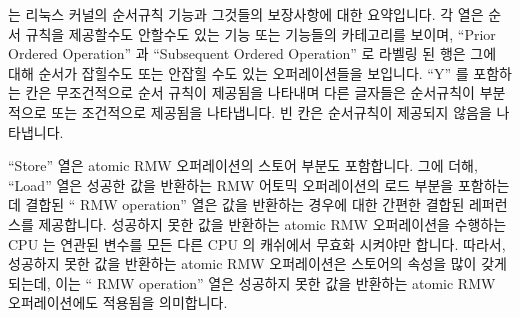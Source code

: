 \begin{table}[tbp]
\vspace{5pt}\hfill
{}\OneColumnHSpace{-0.9in}
\caption{Linux-Kernel Memory-Ordering Cheat Sheet}
\label{tab:memorder:Linux-Kernel Memory-Ordering Cheat Sheet}
\end{table}

는 리눅스 커널의 순서규칙 기능과 그것들의 보장사항에 대한 요약입니다.
각 열은 순서 규칙을 제공할수도 안할수도 있는 기능 또는 기능들의 카테고리를
보이며, ``Prior Ordered Operation'' 과 ``Subsequent Ordered Operation'' 로
라벨링 된 행은 그에 대해 순서가 잡힐수도 또는 안잡힐 수도 있는 오퍼레이션들을 
보입니다.
``Y'' 를 포함하는 칸은 무조건적으로 순서 규칙이 제공됨을 나타내며 다른 글자들은
순서규칙이 부분적으로 또는 조건적으로 제공됨을 나타냅니다.
빈 칸은 순서규칙이 제공되지 않음을 나타냅니다.

``Store'' 열은 atomic RMW 오퍼레이션의 스토어 부분도 포함합니다.
그에 더해, ``Load'' 열은 성공한 값을 반환하는  RMW 어토믹
오퍼레이션의 로드 부분을 포함하는데 결합된 `` RMW operation''
열은 값을 반환하는 경우에 대한 간편한 결합된 레퍼런스를 제공합니다.
성공하지 못한 값을 반환하는 atomic RMW 오퍼레이션을 수행하는 CPU 는 연관된
변수를 모든 다른 CPU 의 캐쉬에서 무효화 시켜야만 합니다.
따라서, 성공하지 못한 값을 반환하는 atomic RMW 오퍼레이션은 스토어의 속성을
많이 갖게 되는데, 이는 `` RMW operation'' 열은 성공하지 못한
값을 반환하는 atomic RMW 오퍼레이션에도 적용됨을 의미합니다.

